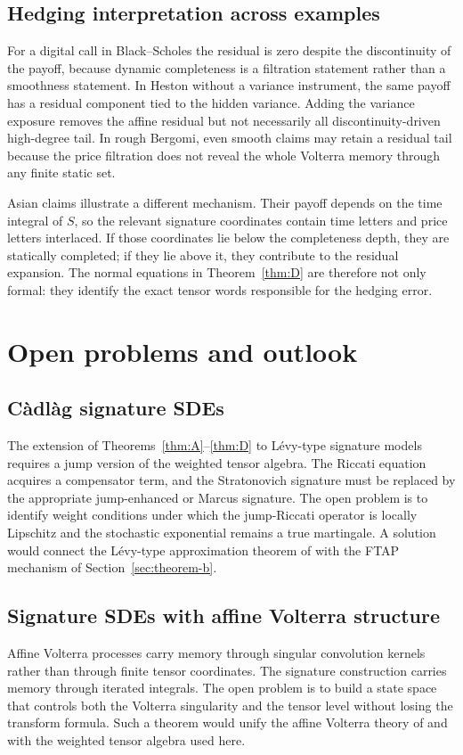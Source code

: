 \documentclass[11pt,oneside]{article}
\theoremstyle{plain}
\theoremstyle{definition}
\theoremstyle{remark}
\begin{document}
\subsection{Hedging interpretation across examples}
\label{subsec:example-hedging-interpretation-expanded}
For a digital call in Black--Scholes the residual is zero despite the discontinuity of the payoff, because dynamic completeness is a filtration statement rather than a smoothness statement. In Heston without a variance instrument, the same payoff has a residual component tied to the hidden variance. Adding the variance exposure removes the affine residual but not necessarily all discontinuity-driven high-degree tail. In rough Bergomi, even smooth claims may retain a residual tail because the price filtration does not reveal the whole Volterra memory through any finite static set.

Asian claims illustrate a different mechanism. Their payoff depends on the time integral of $S$, so the relevant signature coordinates contain time letters and price letters interlaced. If those coordinates lie below the completeness depth, they are statically completed; if they lie above it, they contribute to the residual expansion. The normal equations in Theorem~\ref{thm:D} are therefore not only formal: they identify the exact tensor words responsible for the hedging error.


\section{Open problems and outlook}\label{sec:open-problems}

\subsection{C\`adl\`ag signature SDEs}
The extension of Theorems~\ref{thm:A}--\ref{thm:D} to L\'evy-type signature models requires a jump version of the weighted tensor algebra. The Riccati equation acquires a compensator term, and the Stratonovich signature must be replaced by the appropriate jump-enhanced or Marcus signature. The open problem is to identify weight conditions under which the jump-Riccati operator is locally Lipschitz and the stochastic exponential remains a true martingale. A solution would connect the L\'evy-type approximation theorem of \citet{CuchieroPrimaveraSvalutoFerro2025} with the FTAP mechanism of Section~\ref{sec:theorem-b}.

\subsection{Signature SDEs with affine Volterra structure}
Affine Volterra processes carry memory through singular convolution kernels rather than through finite tensor coordinates. The signature construction carries memory through iterated integrals. The open problem is to build a state space that controls both the Volterra singularity and the tensor level without losing the transform formula. Such a theorem would unify the affine Volterra theory of \citet{AbiJaberLarssonPulido2019} and \citet{BondiLivieriPulido2024} with the weighted tensor algebra used here.
\end{document}

